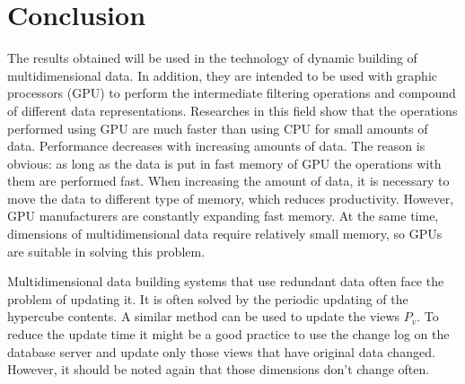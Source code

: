 \documentclass[preprint,12pt]{elsarticle}
\begin{document}
\section{Conclusion}
The results obtained will be used in the technology of dynamic building of
multidimensional data. In addition, they are intended to be used with graphic
processors (GPU) to perform the intermediate filtering operations and compound
of different data representations. Researches in this field show that the
operations performed using GPU are much faster than using CPU for small amounts of
data. Performance decreases with increasing amounts of data. The reason is
obvious: as long as the data is put in fast memory of GPU the operations with
them are performed fast. When increasing the amount of data, it is necessary to
move the data to different type of memory, which reduces productivity. However,
GPU
manufacturers are constantly expanding fast memory. At the same time, dimensions
of multidimensional data require relatively small memory, so GPUs are suitable
in solving this problem.

Multidimensional data building systems that use redundant data often face the
problem of updating it. It is often solved by the periodic updating of the
hypercube contents.
A similar method can be used to update the views $P_v$. To reduce the update
time it might be a good practice to use the change log on the database server
and update only those views that have original data changed. However, it should
be noted again that those dimensions don't change often.



\end{document}
